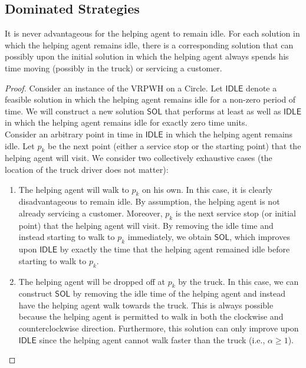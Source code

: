 \documentclass[12pt]{scrartcl}
\begin{document}
\subsection{Dominated Strategies}

\begin{proposition}
It is never advantageous for the helping agent to remain idle. For each solution in which the helping agent remains idle, there is a corresponding solution that can possibly upon the initial solution in which the helping agent always spends his time moving (possibly in the truck) or servicing a customer.
\end{proposition}
\begin{proof}
Consider an instance of the VRPWH on a Circle. Let $\mathsf{IDLE}$ denote a feasible solution in which the helping agent remains idle for a non-zero period of time. We will construct a new solution $\mathsf{SOL}$ that performs at least as well as $\mathsf{IDLE}$ in which the helping agent remains idle for exactly zero time units. \\

Consider an arbitrary point in time in $\mathsf{IDLE}$ in which the helping agent remains idle. Let $p_k$ be the next point (either a service stop or the starting point) that the helping agent will visit. We consider two collectively exhaustive cases (the location of the truck driver does not matter):

\begin{enumerate}
    \item The helping agent will walk to $p_k$ on his own. In this case, it is clearly disadvantageous to remain idle. By assumption, the helping agent is not already servicing a customer. Moreover, $p_k$ is the next service stop (or initial point) that the helping agent will visit. By removing the idle time and instead starting to walk to $p_k$ immediately, we obtain $\mathsf{SOL}$, which improves upon $\mathsf{IDLE}$ by exactly the time that the helping agent remained idle before starting to walk to $p_k.$  
		\item The helping agent will be dropped off at $p_k$ by the truck. In this case, we can construct $\mathsf{SOL}$ by removing the idle time of the helping agent and instead have the helping agent walk towards the truck. This is always possible because the helping agent is permitted to walk in both the clockwise and counterclockwise direction. Furthermore, this solution can only improve upon $\mathsf{IDLE}$ since the helping agent cannot walk faster than the truck (i.e., $\alpha \geq 1$).  
\end{enumerate}


\end{proof}
\end{document}
